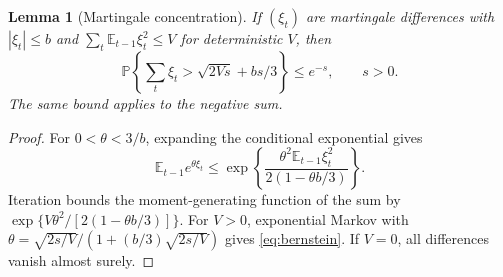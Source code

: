\documentclass[11pt]{article}
\newtheorem{lemma}[theorem]{Lemma}
\theoremstyle{remark}
\newcommand{\E}{\mathbb E}
\newcommand{\Pp}{\mathbb P}
\begin{document}
\begin{lemma}[Martingale concentration]
\label{lem:bernstein}
If $(\xi_t)$ are martingale differences with $|\xi_t|\le b$ and
$\sum_t\E_{t-1}\xi_t^2\le V$ for deterministic $V$, then
\begin{equation}
 \Pp\left\{\sum_t\xi_t>\sqrt{2Vs}+bs/3\right\}\le e^{-s},
 \qquad s>0.
 \label{eq:bernstein}
\end{equation}
The same bound applies to the negative sum.
\end{lemma}
\begin{proof}
For $0<\theta<3/b$, expanding the conditional exponential gives
\[
 \E_{t-1}e^{\theta\xi_t}
 \le\exp\left\{\frac{\theta^2\E_{t-1}\xi_t^2}{2(1-\theta b/3)}\right\}.
\]
Iteration bounds the moment-generating function of the sum by
$\exp\{V\theta^2/[2(1-\theta b/3)]\}$.
For $V>0$, exponential Markov with
$\theta=\sqrt{2s/V}/(1+(b/3)\sqrt{2s/V})$ gives \eqref{eq:bernstein}.
If $V=0$, all differences vanish almost surely.
\end{proof}
\end{document}
